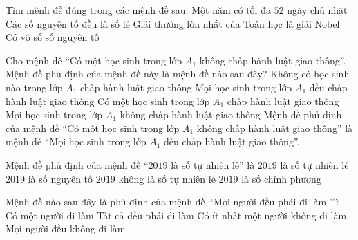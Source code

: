 \begin{ex}%
Tìm mệnh đề đúng trong các mệnh đề sau.
\choice
{Một năm có tối đa $52$ ngày chủ nhật}
{Các số nguyên tố đều là số lẻ}
{Giải thưởng lớn nhất của Toán học là giải Nobel}
{\True Có vô số số nguyên tố}
\end{ex}

\begin{ex}%
	Cho mệnh đề ``Có một học sinh trong lớp $A_1$ không chấp hành luật giao thông''. Mệnh đề phủ định của mệnh đề này là mệnh đề nào sau đây?
	\choice
	{Không có học sinh nào trong lớp $A_1$ chấp hành luật giao thông}
	{\True Mọi học sinh trong lớp $A_1$ đều chấp hành luật giao thông}
	{Có một học sinh trong lớp $A_1$ chấp hành luật giao thông}
	{Mọi học sinh trong lớp $A_1$ không chấp hành luật giao thông}
	\loigiai
	{
		Mệnh đề phủ định của mệnh đề ``Có một học sinh trong lớp $A_1$ không chấp hành luật giao thông'' là mệnh đề ``Mọi học sinh trong lớp $A_1$ đều chấp hành luật giao thông''.
	}
\end{ex} 

\begin{ex}%
	Mệnh đề phủ định của mệnh đề “$2019$ là số tự nhiên lẻ” là
	\choice
	{$2019$ là số tự nhiên lẻ}
	{$2019$ là số nguyên tố}
	{\True $2019$ không là số tự nhiên lẻ}
	{$2019$ là số chính phương}
\end{ex}

\begin{ex}%
	Mệnh đề nào sau đây là phủ định của mệnh đề  \lq\lq  Mọi người đều phải đi làm \rq\rq?
	\choice
	{Có một người đi làm}
	{Tất cả đều phải đi làm}
	{\True Có ít nhất một người không đi làm}
	{Mọi người đều không đi làm}
\end{ex}

